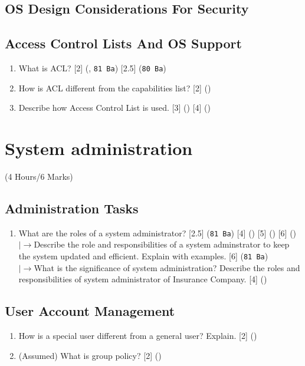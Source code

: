 \documentclass[12pt]{article}
\newcommand{\lb}{\\$\left|\rightarrow\right.$}
\begin{document}
	\subsection{OS Design Considerations For Security}
	\subsection{Access Control Lists And OS Support}
		\begin{enumerate}
			\item What is ACL? \hfill [2] (, \texttt{81 Ba}) [2.5] (\texttt{80 Ba})

			\item How is ACL different from the capabilities list? \hfill [2] ()

			\item Describe how Access Control List is used. \hfill [3] () [4] ()
		\end{enumerate}

	\pagebreak

\section{System administration}
	\begin{center}(4 Hours/6 Marks)\end{center}
	\subsection{Administration Tasks}
		\begin{enumerate}
			\item What are the roles of a system administrator? \hfill [2.5] (\texttt{81 Ba}) [4] () [5] () [6] ()
			\lb Describe the role and responsibilities of a system adminstrator to keep the system updated and efficient. Explain with examples. \hfill [6] (\texttt{81 Ba})
			\lb What is the significance of system administration? Describe the roles and responsibilities of system administrator of Insurance Company. \hfill [4] ()
		\end{enumerate}

	\subsection{User Account Management}
		\begin{enumerate}
			\item How is a special user different from a general user? Explain. \hfill [2] ()

			\item (Assumed) What is group policy? \hfill [2] ()
		\end{enumerate}
\end{document}
